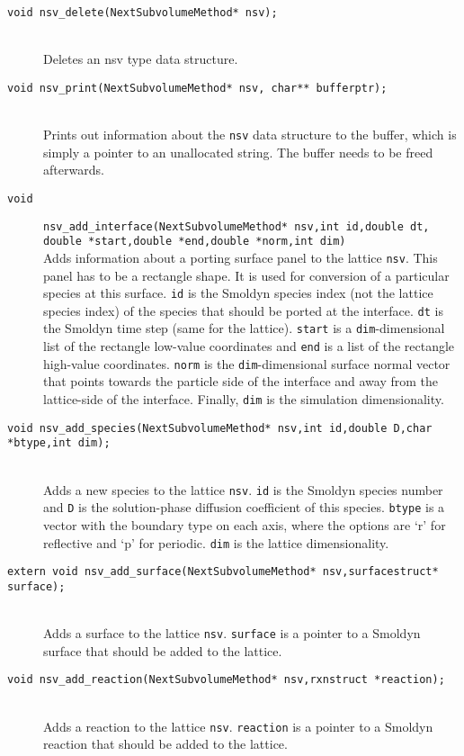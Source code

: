 \documentclass {book}
\begin{document}
\begin{description}
\item[\texttt{void nsv\_delete(NextSubvolumeMethod* nsv);}]
\hfill \\
Deletes an nsv type data structure.

\item[\texttt{void nsv\_print(NextSubvolumeMethod* nsv, char** bufferptr);}]
\hfill \\
Prints out information about the \texttt{nsv} data structure to the buffer, which is simply a pointer to an unallocated string. The buffer needs to be freed afterwards.

\item[\texttt{void}]
\texttt{nsv\_add\_interface(NextSubvolumeMethod* nsv,int id,double dt, double *start,double *end,double *norm,int dim)}
\hfill \\
Adds information about a porting surface panel to the lattice \texttt{nsv}. This panel has to be a rectangle shape. It is used for conversion of a particular species at this surface. \texttt{id} is the Smoldyn species index (not the lattice species index) of the species that should be ported at the interface. \texttt{dt} is the Smoldyn time step (same for the lattice). \texttt{start} is a \texttt{dim}-dimensional list of the rectangle low-value coordinates and \texttt{end} is a list of the rectangle high-value coordinates. \texttt{norm} is the \texttt{dim}-dimensional surface normal vector that points towards the particle side of the interface and away from the lattice-side of the interface. Finally, \texttt{dim} is the simulation dimensionality.

\item[\texttt{void nsv\_add\_species(NextSubvolumeMethod* nsv,int id,double D,char *btype,int dim);}]
\hfill \\
Adds a new species to the lattice \texttt{nsv}. \texttt{id} is the Smoldyn species number and \texttt{D} is the solution-phase diffusion coefficient of this species. \texttt{btype} is a vector with the boundary type on each axis, where the options are `r' for reflective and `p' for periodic. \texttt{dim} is the lattice dimensionality.

\item[\texttt{extern void nsv\_add\_surface(NextSubvolumeMethod* nsv,surfacestruct* surface);}]
\hfill \\
Adds a surface to the lattice \texttt{nsv}. \texttt{surface} is a pointer to a Smoldyn surface that should be added to the lattice.

\item[\texttt{void nsv\_add\_reaction(NextSubvolumeMethod* nsv,rxnstruct *reaction);}]
\hfill \\
Adds a reaction to the lattice \texttt{nsv}. \texttt{reaction} is a pointer to a Smoldyn reaction that should be added to the lattice.


\end{description}
\end{document}
